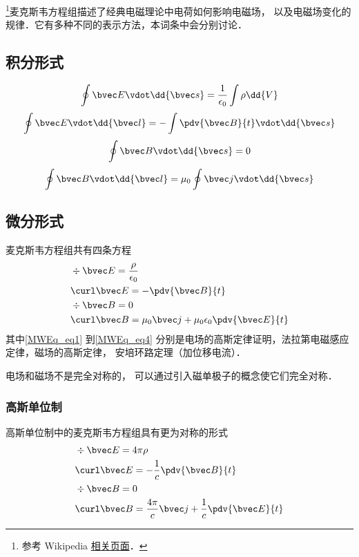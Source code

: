 
\begin{issues}
\issueDraft
\end{issues}

\footnote{参考 Wikipedia \href{https://en.wikipedia.org/wiki/Maxwell's_equations}{相关页面}．}麦克斯韦方程组描述了经典电磁理论中电荷如何影响电磁场， 以及电磁场变化的规律．它有多种不同的表示方法，本词条中会分别讨论．

\subsection{积分形式}
\begin{equation}
\oint \bvec E \vdot \dd{\bvec s} = \frac{1}{\epsilon_0}\int \rho \dd{V}
\end{equation}
\begin{equation}
\oint \bvec E \vdot \dd{\bvec l} = -\int \pdv{\bvec B}{t} \vdot \dd{\bvec s}
\end{equation}
\begin{equation}
\oint \bvec B \vdot \dd{\bvec s} = 0
\end{equation}
\begin{equation}
\oint \bvec B \vdot \dd{\bvec l} = \mu_0 \oint \bvec j \vdot \dd{\bvec s}
\end{equation}


\subsection{微分形式}
麦克斯韦方程组共有四条方程
\begin{align}
\label{MWEq_eq1}
&\div \bvec E = \frac{\rho}{\epsilon_0}\\
\label{MWEq_eq2}
&\curl \bvec E = -\pdv{\bvec B}{t}\\
\label{MWEq_eq3}
&\div \bvec B = 0 \\
\label{MWEq_eq4}
&\curl \bvec B = \mu_0 \bvec j + \mu_0\epsilon_0 \pdv{\bvec E}{t}
\end{align}
其中\autoref{MWEq_eq1} 到\autoref{MWEq_eq4} 分别是电场的高斯定律证明，法拉第电磁感应定律，磁场的高斯定律， 安培环路定理（加位移电流）．%

电场和磁场不是完全对称的， 可以通过引入磁单极子的概念使它们完全对称．

\subsubsection{高斯单位制}
高斯单位制中的麦克斯韦方程组具有更为对称的形式
\begin{align}
&\div \bvec E = 4\pi\rho\\
&\curl \bvec E = -\frac{1}{c}\pdv{\bvec B}{t}\\
&\div \bvec B = 0 \\
&\curl \bvec B = \frac{4\pi}{c} \bvec j + \frac{1}{c}\pdv{\bvec E}{t}
\end{align}

